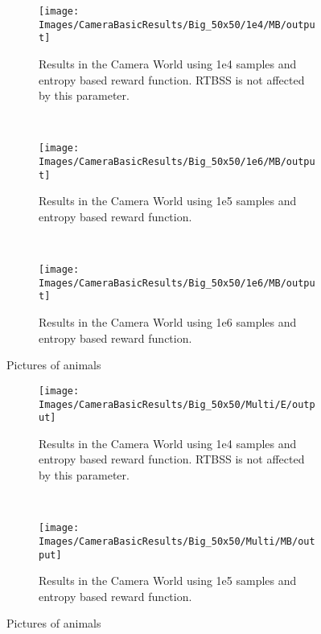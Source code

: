 \begin{figure}[h]
        \centering
        \begin{subfigure}[t]{0.3\textwidth}
                \texttt{[image: Images/CameraBasicResults/Big\_50x50/1e4/MB/output]}
                \caption{Results in the Camera World using 1e4 samples and entropy based reward
                function. RTBSS is not affected by this parameter.}
                \label{fig:m4e}
        \end{subfigure}%
        ~ %
        \begin{subfigure}[t]{0.3\textwidth}
                \texttt{[image: Images/CameraBasicResults/Big\_50x50/1e6/MB/output]}
                \caption{Results in the Camera World using 1e5 samples and entropy based reward
                function.}
                \label{fig:m5e}
        \end{subfigure}
        ~ %
        \begin{subfigure}[t]{0.3\textwidth}
                \texttt{[image: Images/CameraBasicResults/Big\_50x50/1e6/MB/output]}
                \caption{Results in the Camera World using 1e6 samples and entropy based reward
                function.}
                \label{fig:m6e}
        \end{subfigure}
        \caption{Pictures of animals}\label{fig:me}
\end{figure}

\begin{figure}[h]
        \centering
        \begin{subfigure}[t]{0.5\textwidth}
                \texttt{[image: Images/CameraBasicResults/Big\_50x50/Multi/E/output]}
                \caption{Results in the Camera World using 1e4 samples and entropy based reward
                function. RTBSS is not affected by this parameter.}
                \label{fig:m4e}
        \end{subfigure}%
        ~ %
        \begin{subfigure}[t]{0.5\textwidth}
                \texttt{[image: Images/CameraBasicResults/Big\_50x50/Multi/MB/output]}
                \caption{Results in the Camera World using 1e5 samples and entropy based reward
                function.}
                \label{fig:m5e}
        \end{subfigure}
        \caption{Pictures of animals}\label{fig:me}
\end{figure}

